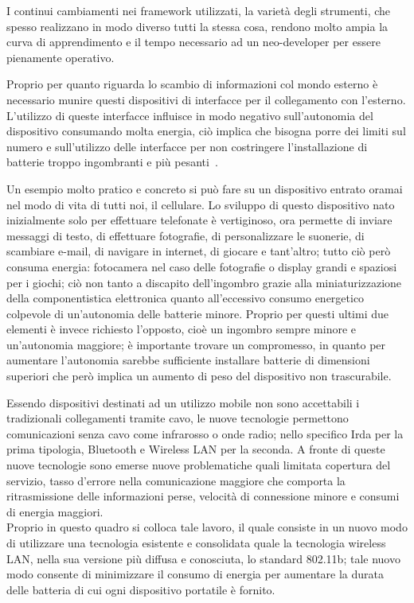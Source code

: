 I continui cambiamenti nei framework utilizzati, la variet\`a degli strumenti, che spesso realizzano in modo diverso tutti la stessa cosa, rendono molto ampia la curva di apprendimento e il tempo necessario ad un neo-developer per essere pienamente operativo.


Proprio per quanto riguarda lo scambio di informazioni col mondo esterno \`e necessario munire questi
dispositivi di interfacce per il collegamento con l'esterno. L'utilizzo di queste interfacce influisce in
modo negativo sull'autonomia del dispositivo consumando molta energia, ci\`o implica che bisogna porre dei
limiti sul numero e sull'utilizzo delle interfacce per non costringere l'installazione di batterie troppo
ingombranti e pi\`u pesanti~\cite{CariniMumoloSicuranza}.

Un esempio molto pratico e concreto si pu\`o fare su un dispositivo entrato oramai nel modo di vita di tutti
noi, il cellulare. Lo sviluppo di questo dispositivo nato inizialmente solo per effettuare telefonate \`e
vertiginoso, ora permette di inviare messaggi di testo, di effettuare fotografie, di personalizzare le
suonerie, di scambiare e-mail, di navigare in internet, di giocare e tant'altro; tutto ci\`o per\`o consuma
energia: fotocamera nel caso delle fotografie o display grandi e spaziosi per i giochi; ci\`o non tanto a
discapito dell'ingombro grazie alla miniaturizzazione della componentistica elettronica quanto
all'eccessivo consumo energetico colpevole di un'autonomia delle batterie minore. Proprio per questi ultimi
due elementi \`e invece richiesto l'opposto, cio\`e un ingombro sempre minore e un'autonomia maggiore; \`e
importante trovare un compromesso, in quanto per aumentare l'autonomia sarebbe sufficiente installare
batterie di dimensioni superiori che per\`o implica un aumento di peso del dispositivo non trascurabile.

Essendo dispositivi destinati ad un utilizzo mobile non sono accettabili i tradizionali collegamenti tramite
cavo, le nuove tecnologie permettono comunicazioni senza cavo come infrarosso o onde radio; nello specifico
Irda per la prima tipologia, Bluetooth e Wireless LAN per la seconda. A fronte di queste nuove tecnologie
sono emerse nuove problematiche quali limitata copertura del servizio, tasso d'errore nella comunicazione
maggiore che comporta la ritrasmissione delle informazioni perse, velocit\`a di connessione minore e consumi
di energia maggiori. \\
Proprio in questo quadro si colloca tale lavoro, il quale consiste in un nuovo modo di utilizzare una
tecnologia esistente e consolidata quale la tecnologia wireless LAN, nella sua versione pi\`u diffusa e
conosciuta, lo standard 802.11b; tale nuovo modo consente di minimizzare il consumo di energia per aumentare
la durata delle batteria di cui ogni dispositivo portatile \`e fornito.

